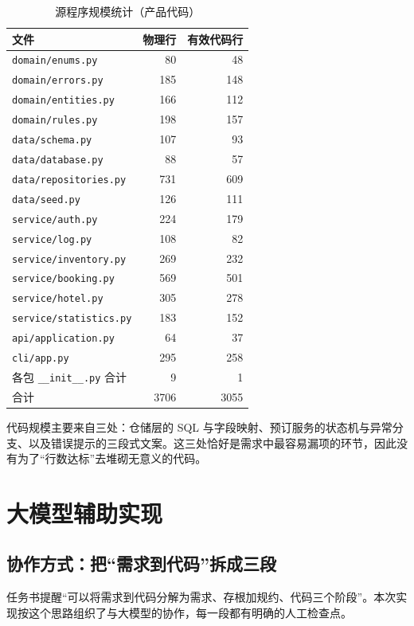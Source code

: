 \documentclass[11pt,a4paper,fontset=none]{ctexart}
\begin{document}
\begin{table}[H]
\centering
\caption{源程序规模统计（产品代码）}
\small
\begin{tabular}{lrr}
\toprule
文件 & 物理行 & 有效代码行 \\
\midrule
\texttt{domain/enums.py} & 80 & 48 \\
\texttt{domain/errors.py} & 185 & 148 \\
\texttt{domain/entities.py} & 166 & 112 \\
\texttt{domain/rules.py} & 198 & 157 \\
\texttt{data/schema.py} & 107 & 93 \\
\texttt{data/database.py} & 88 & 57 \\
\texttt{data/repositories.py} & 731 & 609 \\
\texttt{data/seed.py} & 126 & 111 \\
\texttt{service/auth.py} & 224 & 179 \\
\texttt{service/log.py} & 108 & 82 \\
\texttt{service/inventory.py} & 269 & 232 \\
\texttt{service/booking.py} & 569 & 501 \\
\texttt{service/hotel.py} & 305 & 278 \\
\texttt{service/statistics.py} & 183 & 152 \\
\texttt{api/application.py} & 64 & 37 \\
\texttt{cli/app.py} & 295 & 258 \\
各包 \texttt{\_\_init\_\_.py} 合计 & 9 & 1 \\
\midrule
合计 & 3706 & 3055 \\
\bottomrule
\end{tabular}
\end{table}

代码规模主要来自三处：仓储层的 SQL 与字段映射、预订服务的状态机与异常分支、以及错误提示的三段式文案。这三处恰好是需求中最容易漏项的环节，因此没有为了“行数达标”去堆砌无意义的代码。

\section{大模型辅助实现}
\label{sec:llm}

\subsection{协作方式：把“需求到代码”拆成三段}

任务书提醒“可以将需求到代码分解为需求、存根加规约、代码三个阶段”。本次实现按这个思路组织了与大模型的协作，每一段都有明确的人工检查点。
\end{document}
